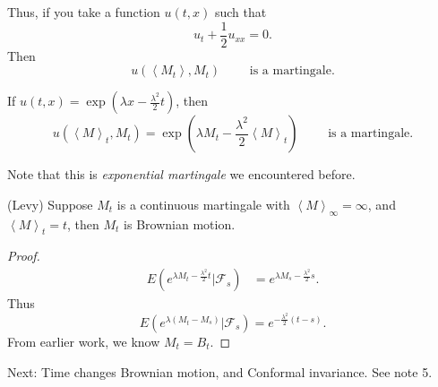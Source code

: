 Thus, if you take a function $u(t, x)$ such that
\[
	u_t + \frac{1}{2} u_{x x} = 0
.\] 
Then
\[
	u\left( \left\langle M_t \right\rangle , M_t \right) \qquad \text{ is a martingale}
.\] 

\begin{corollary}
	If $u(t, x) = \exp\left( \lambda x - \frac{\lambda^2}{2} t \right) $, then
	\[
		u\left( \left\langle M \right\rangle _t, M_t \right) 
		= \exp\left( \lambda M_t - \frac{\lambda^2}{2}\left\langle M \right\rangle _t \right)  \qquad \text{ is a martingale}
	.\] 
\end{corollary}
Note that this is \textit{exponential martingale} we encountered before.

\begin{theorem}(Levy)
	Suppose $M_t$ is a continuous martingale with $\left\langle M \right\rangle _{\infty } = \infty $, and $\left\langle M \right\rangle _t = t$, then $M_t$ is Brownian motion.
\end{theorem}
\begin{proof}
	\begin{align*}
		E (e^{\lambda M_t - \frac{\lambda^2}{2}t} | \mathcal{F}_s)
		&= e^{\lambda M_s - \frac{\lambda^2}{2} s} 
	.\end{align*}
	Thus
	\[
		E\left( e^{\lambda (M_t - M_s)} | \mathcal{F}_s \right) 
		= e^{- \frac{\lambda^2}{2}(t - s)}
	.\] 
	From earlier work, we know $M_t = B_t$.
\end{proof}

Next: 
Time changes Brownian motion, and
Conformal invariance. See note 5.

